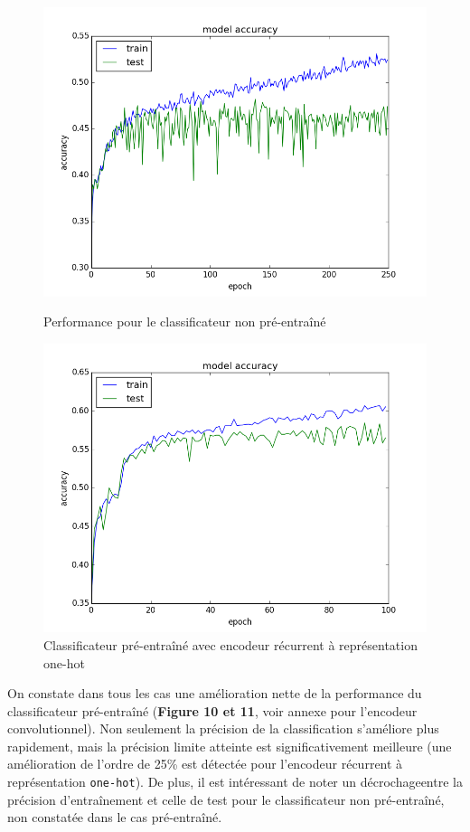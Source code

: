 \documentclass[a4paper, 11pt, onecolumn]{article}
\begin{document}
\begin{figure}[!tbp]
\centering  
  \begin{minipage}[b]{0.45\textwidth}
    \includegraphics[width=1.2\textwidth]{SupClass}
    \caption{Performance pour le classificateur non pré-entraîné}
  \end{minipage}
  \hfill
  \begin{minipage}[b]{0.5\textwidth}
    \includegraphics[width=1.1\textwidth]{SpeClass}
    \caption{Classificateur pré-entraîné avec encodeur
      récurrent à représentation one-hot}
  \end{minipage}
\end{figure}

On constate dans tous les cas une amélioration nette de la performance du
classificateur pré-entraîné (\textbf{Figure 10 et 11}, voir annexe pour
l'encodeur convolutionnel). Non seulement la précision de la classification
s'améliore plus rapidement, mais la précision limite atteinte est
significativement meilleure (une amélioration de l'ordre de 25\% est détectée
pour l'encodeur récurrent à représentation \texttt{one-hot}). De plus, il est
intéressant de noter un \og décrochage\fg entre la précision d'entraînement et
celle de test pour le classificateur non pré-entraîné, non constatée dans le cas pré-entraîné.
\end{document}
